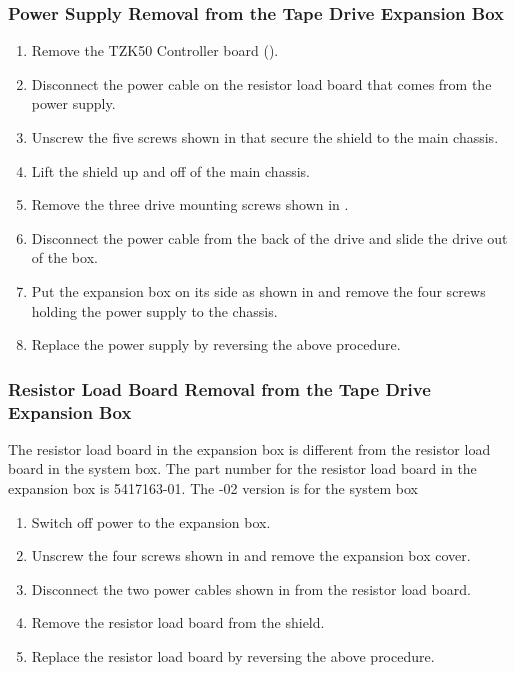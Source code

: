 \subsubsection{Power Supply Removal from the Tape Drive Expansion Box}
\begin{enumerate}
\item	Remove the TZK50 Controller board ().
\item	Disconnect the power cable on the resistor load board that comes from
		the power supply.
\item	Unscrew the five screws shown in  that secure the shield to
		the main chassis.
\item	Lift the shield up and off of the main chassis.
\item	Remove the three drive mounting screws shown in .
\item	Disconnect the power cable from the back of the drive and slide the
		drive out of the box.
\newpage

\item	Put the expansion box on its side as shown in  and remove
		the four screws holding the power supply to the chassis.

\item	Replace the power supply by reversing the above procedure.
\end{enumerate}
\newpage

\subsubsection{Resistor Load Board Removal from the Tape Drive Expansion Box}

The resistor load board in the expansion box is different from the resistor
load board in the system box. The part number for the resistor load board
in the expansion box is 5417163-01. The -02 version is for the system box

\begin{enumerate}
\item	Switch off power to the expansion box.
\item	Unscrew the four screws shown in  and remove the expansion box cover.
\item	Disconnect the two power cables shown in  from the resistor load board.
\newpage
\item	Remove the resistor load board from the shield.
\item	Replace the resistor load board by reversing the above procedure.
\end{enumerate}

